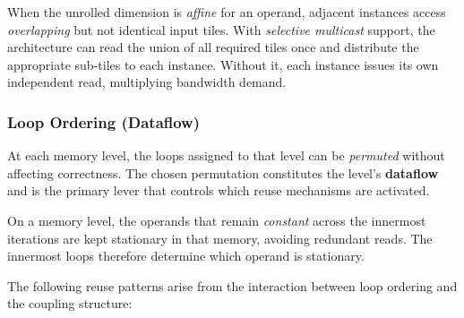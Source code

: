 When the unrolled dimension is \emph{affine} for an operand,  adjacent instances
access \emph{overlapping} but not identical input tiles.
With \emph{selective multicast} support, the architecture can read
the union of all required tiles once and distribute the appropriate
sub-tiles to each instance.
Without it, each instance issues its own independent read, multiplying
bandwidth demand.

\subsubsection{Loop Ordering (Dataflow)}
\label{sec:loop-ordering}

At each memory level, the loops assigned to that level can be
\emph{permuted} without affecting correctness.
The chosen permutation constitutes the level's \textbf{dataflow} and
is the primary lever that controls which reuse mechanisms are
activated.

On a memory level, the operands that remain \emph{constant} across
the innermost iterations are kept stationary in that memory, avoiding
redundant reads.
The innermost loops therefore determine which operand is stationary.

The following reuse patterns arise from the interaction between loop
ordering and the coupling structure:

